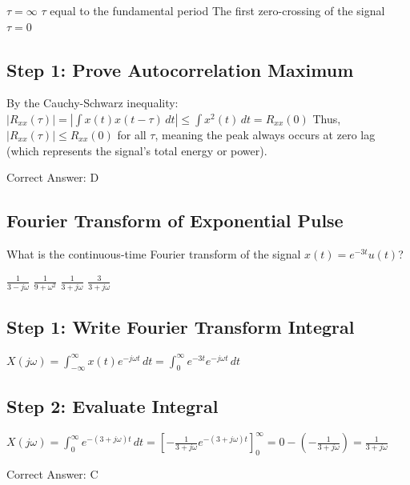 \begin{choices}
    \choice $\tau = \infty$
    \choice $\tau$ equal to the fundamental period
    \choice The first zero-crossing of the signal
    \correctchoice $\tau = 0$
\end{choices}

\begin{solution}

\subsection*{Step 1: Prove Autocorrelation Maximum}
By the Cauchy-Schwarz inequality:
$|R_{xx}(\tau)| = \left| \int x(t) x(t-\tau)\, dt \right| \le \int x^2(t)\, dt = R_{xx}(0)$
Thus, $|R_{xx}(\tau)| \le R_{xx}(0)$ for all $\tau$, meaning the peak always occurs at zero lag (which represents the signal's total energy or power).

Correct Answer: D
\end{solution}

\clearpage

\subsection{Fourier Transform of Exponential Pulse}

What is the continuous-time Fourier transform of the signal $x(t) = e^{-3t} u(t)$?

\begin{choices}
    \choice $\frac{1}{3 - j\omega}$
    \choice $\frac{1}{9 + \omega^2}$
    \correctchoice $\frac{1}{3 + j\omega}$
    \choice $\frac{3}{3 + j\omega}$
\end{choices}

\begin{solution}

\subsection*{Step 1: Write Fourier Transform Integral}
$X(j\omega) = \int_{-\infty}^{\infty} x(t) e^{-j\omega t}\, dt = \int_{0}^{\infty} e^{-3t} e^{-j\omega t}\, dt$

\subsection*{Step 2: Evaluate Integral}
$X(j\omega) = \int_{0}^{\infty} e^{-(3 + j\omega)t}\, dt = \left[ -\frac{1}{3 + j\omega} e^{-(3 + j\omega)t} \right]_{0}^{\infty} = 0 - \left( -\frac{1}{3 + j\omega} \right) = \frac{1}{3 + j\omega}$

Correct Answer: C
\end{solution}

